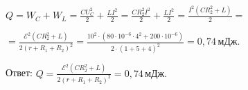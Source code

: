 \documentclass[12pt,a4paper]{article}
\begin{document}
{$Q=W_C + W_L= \frac{CU ^2 _C}{2} + \frac{LI ^2}{2} = \frac{CR ^2 _2 I ^2}{2} + \frac{LI ^2}{2} = \frac{I ^2 ( CR ^2 _2 + L )}{2} =$

$= \frac{\mathcal{E} ^2 ( CR ^2 _2 + L )}{2 ( r + R_1 + R_2 ) ^2} = \frac{10 ^2 \cdot ( 80 \cdot 10 ^{ - 6 } \cdot 4 ^2 + 200 \cdot 10 ^{ - 6 } )}{2 \cdot ( 1 + 5 + 4 ) ^2} =0{,}74\,\text{мДж}.$

Ответ: $Q= \frac{\mathcal{E} ^2 ( CR ^2 _2 + L )}{2 ( r + R_1 + R_2 ) ^2} =0{,}74\,\text{мДж}.$
}
\end{document}
